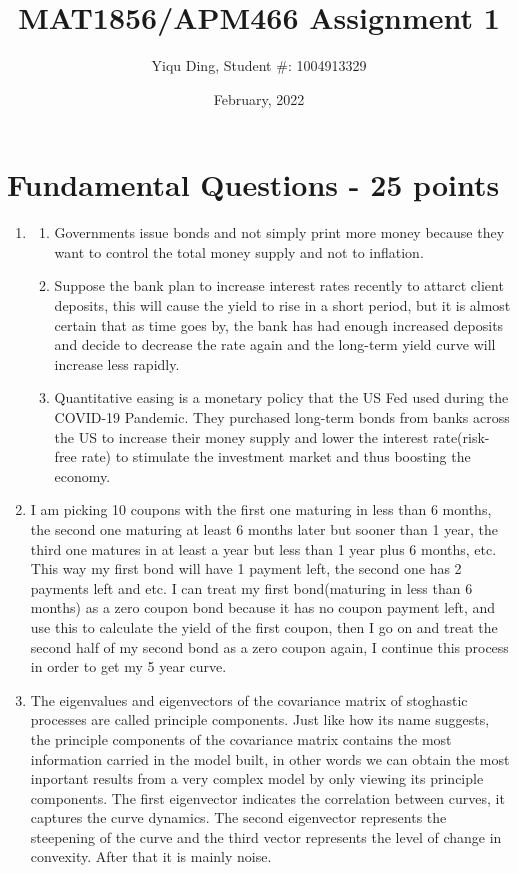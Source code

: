 \documentclass{article}
\title{MAT1856/APM466 Assignment 1}
\author{Yiqu Ding, Student \#: 1004913329}
\date{February, 2022}
\begin{document}
\maketitle

\section*{Fundamental Questions - 25 points}

\begin{enumerate}
    \item \hfill
    \begin{enumerate}
        \item Governments issue bonds and not simply print more money because they want to control the total money supply and not to inflation.
        \item Suppose the bank plan to increase interest rates recently to attarct client deposits, this will cause the yield to rise in a short period, but it is almost certain that as time goes by, the bank has had enough increased deposits and decide to decrease the rate again and the long-term yield curve will increase less rapidly.
        \item Quantitative easing is a monetary policy that the US Fed used during the COVID-19 Pandemic. They purchased long-term bonds from banks across the US to increase their money supply and lower the interest rate(risk-free rate) to stimulate the investment market and thus boosting the economy. 
    \end{enumerate}
    \item  I am picking 10 coupons with the first one maturing in less than 6 months, the second one maturing at least 6 months later but sooner than 1 year, the third one matures in at least a year but less than 1 year plus 6 months, etc. This way my first bond will have 1 payment left, the second one has 2 payments left and etc. I can treat my first bond(maturing in less than 6 months) as a zero coupon bond because it has no coupon payment left, and use this to calculate the yield of the first coupon, then I go on and treat the second half of my second bond as a zero coupon again, I continue this process in order to get my 5 year curve.
    \item The eigenvalues and eigenvectors of the covariance matrix of stoghastic processes are called principle components. Just like how its name suggests, the principle components of the covariance matrix contains the most information carried in the model built, in other words we can obtain the most inportant results from a very complex model by only viewing its principle components. The first eigenvector indicates the correlation between curves, it captures the curve dynamics. The second eigenvector represents the steepening of the curve and the third vector represents the level of change in convexity. After that it is mainly noise.
\end{enumerate}
\end{document}
